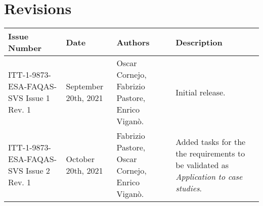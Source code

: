 
\section*{Revisions}
\label{sec:revisions}

\setlength\LTleft{0pt}
\setlength\LTright{0pt}
\scriptsize
\begin{longtable}{|p{2cm}|p{2cm}|p{2cm}|p{7cm}|@{}}
\label{table:codeoperators} \\
\hline
\textbf{Issue Number}&\textbf{Date}&\textbf{Authors}&\textbf{Description}\\
\hline
ITT-1-9873-ESA-FAQAS-SVS
Issue 1 Rev. 1&
September 20th, 2021&
Oscar Cornejo, Fabrizio Pastore, Enrico Viganò.&
\begin{minipage}{8cm}
Initial release.
\end{minipage}
\\
\hline
ITT-1-9873-ESA-FAQAS-SVS
Issue 2 Rev. 1&
October 20th, 2021&
Fabrizio Pastore, Oscar Cornejo, Enrico Viganò.&
\begin{minipage}{8cm}
Added tasks for the the requirements to be validated as \emph{Application to case studies}.
\end{minipage}
\\
\hline




\end{longtable}
\normalsize

\clearpage
